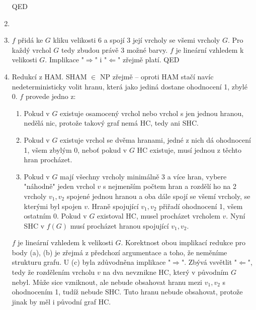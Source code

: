 \documentclass[a4wide,12pt]{extarticle}
\begin{document}
\begin{enumerate}
\begin{itemize}
		\end{itemize}
		 QED
	\item
	\item
		$f$ přidá ke $G$ kliku velikosti 6 a spojí 3 její vrcholy se všemi vrcholy $G$. Pro každý vrchol $G$ tedy zbudou právě 3 možné barvy. $f$ je lineární vzhledem k velikosti $G$. Implikace "$\Rightarrow$" i "$\Leftarrow$" zřejmě platí. QED
	\item
		Redukcí z HAM. SHAM $\in$ NP zřejmě -- oproti HAM stačí navíc nedeterministicky volit hranu, která jako jediná dostane ohodnocení 1, zbylé 0. $f$ provede jedno z:
		\begin{enumerate}
			\item Pokud v $G$ existuje osamocený vrchol nebo vrchol s jen jednou hranou, nedělá nic, protože takový graf nemá HC, tedy ani SHC.
			\item Pokud v $G$ existuje vrchol se dvěma hranami, jedné z nich dá ohodnocení 1, všem zbylým 0, neboť pokud v $G$ HC existuje, musí jednou z těchto hran procházet.
			\item Pokud v $G$ mají všechny vrcholy minimálně 3 a více hran, vybere "náhodně" jeden vrchol $v$ s nejmenším počtem hran a rozdělí ho na 2 vrcholy $v_1, v_2$ spojené jednou hranou a oba dále spojí se všemí vrcholy, se kterými byl spojen $v$. Hraně spojující $v_1, v_2$ přiřadí ohodnocení 1, všem ostatním 0. Pokud v $G$ existoval HC, musel procházet vrcholem $v$. Nyní SHC v $f(G)$ musí procházet hranou spojující $v_1, v_2$.
		\end{enumerate}
		$f$ je lineární vzhledem k velikosti $G$. Korektnost obou implikací redukce pro body (a), (b) je zřejmá z předchozí argumentace a toho, že neměníme strukturu grafu. U (c) byla zdůvodněna implikace "$\Rightarrow$". Zbývá vsvětlit "$\Leftarrow$", tedy že rozdělením vrcholu $v$ na dva nevznikne HC, který v původním $G$ nebyl. Může sice vzniknout, ale nebude obsahovat hranu mezi $v_1, v_2$ s ohodnocením 1, tudíž nebude SHC. Tuto hranu nebude obsahovat, protože jinak by měl i původní graf HC.
\end{enumerate}
\end{document}
